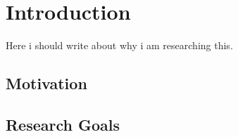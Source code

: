 
\chapter{Introduction}

Here i should write about why i am researching this.

\section{Motivation}

\section{Research Goals}



\cleardoublepage